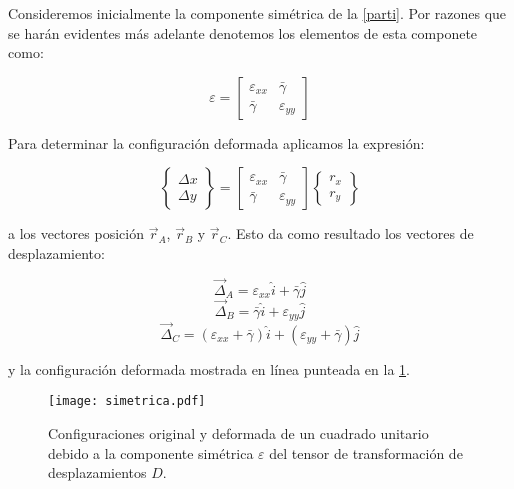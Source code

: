\documentclass[../notas medios.tex]{subfiles}
\begin{document}
Consideremos inicialmente la componente simétrica de la \cref{parti}. Por razones que se harán evidentes más adelante denotemos los elementos de esta componete como:

\[\varepsilon  = \left[ {\begin{array}{*{20}{c}}
{{\varepsilon _{xx}}}&\bar{\gamma} \\
\bar{\gamma} &{{\varepsilon _{yy}}}
\end{array}} \right]\]

Para determinar la configuración deformada aplicamos la expresión:

\[\left\{ {\begin{array}{*{20}{c}}
{\Delta x}\\
{\Delta y}
\end{array}} \right\} = \left[ {\begin{array}{*{20}{c}}
{{\varepsilon _{xx}}}&\bar{\gamma} \\
\bar{\gamma} &{{\varepsilon _{yy}}}
\end{array}} \right]\left\{ {\begin{array}{*{20}{c}}
{{r_x}}\\
{{r_y}}
\end{array}} \right\}\]

a los vectores posición $\vec{r}_A$, $\vec{r}_B$ y $\vec{r}_C$. Esto da como resultado los vectores de desplazamiento:

\[{{\vec \Delta }_A} = {\varepsilon _{xx}}\hat i + \bar{\gamma} \hat j\]
\[{{\vec \Delta }_B} = \bar{\gamma} \hat i + {\varepsilon _{yy}}\hat j\]
\[{{\vec \Delta }_C} = ({\varepsilon _{xx}} +\bar{\gamma}  )\hat i + ({\varepsilon _{yy}} + \bar{\gamma} )\hat j\]

y la configuración deformada mostrada en línea punteada en la \cref{sime}.


\begin{figure}[H]
\centering
	\texttt{[image: simetrica.pdf]}
	\caption{Configuraciones original y deformada de un cuadrado unitario debido a la componente simétrica $\varepsilon$ del tensor de transformación de desplazamientos $D$.}
	\label{sime}
\end{figure}
\end{document}
